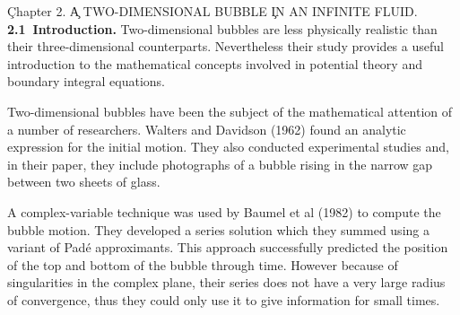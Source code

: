 \vbox{
\c{\bigrmb Chapter 2.}
\vskip 1cm
\c{\bigrm A TWO-DIMENSIONAL BUBBLE}
\c{\bigrm IN AN INFINITE FLUID.}
\vskip 15pt
\hbox {\bf 2.1 Introduction.}
\vskip 5pt
}
Two-dimensional bubbles are less physically realistic
than their three-dimensional counterparts. Nevertheless their 
study provides a useful introduction
to the mathematical concepts involved in potential theory and
boundary integral equations.

Two-dimensional bubbles have been the subject of the mathematical
attention of a  number  of researchers. Walters and
Davidson (1962) found an analytic expression for the initial motion.
They also conducted experimental studies and, in their paper, they include
photographs of a bubble rising in the narrow gap between two sheets of glass.

A complex-variable technique was used by Baumel et al (1982) to
compute the bubble motion.
They developed a series solution which they summed using 
a variant of Pad{\'e} approximants.
This approach successfully predicted
the position of the top and bottom of the bubble through time.
However because of singularities in the complex
plane, their series does not have a very large radius of convergence,
thus they could only use it to give information for small times.

